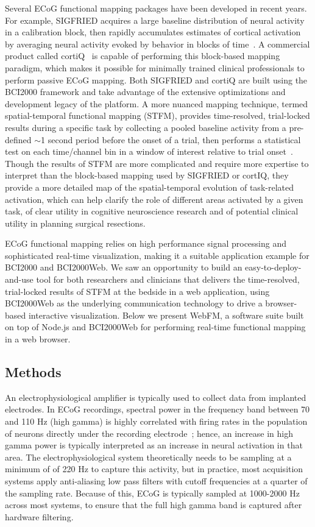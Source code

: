 \documentclass[utf8]{frontiersSCNS}
\begin{document}
Several ECoG functional mapping packages have been developed in recent years.
For example, SIGFRIED acquires a large baseline distribution of neural activity in a calibration block, then rapidly accumulates estimates of cortical activation by averaging neural activity evoked by behavior in blocks of time~\citep{brunner_practical_2009}.
A commercial product called cortiQ~\citep{prueckl_cortiq_2013} is capable of performing this block-based mapping paradigm, which makes it possible for minimally trained clinical professionals to perform passive ECoG mapping.
Both SIGFRIED and cortiQ are built using the BCI2000 framework and take advantage of the extensive optimizations and development legacy of the platform.
A more nuanced mapping technique, termed spatial-temporal functional mapping (STFM), provides time-resolved, trial-locked results during a specific task by collecting a pooled baseline activity from a pre-defined $\sim$1 second period before the onset of a trial, then performs a statistical test on each time/channel bin in a window of interest relative to trial onset~\citep{wang_spatial-temporal_2016}.
Though the results of STFM are more complicated and require more expertise to interpret than the block-based mapping used by SIGFRIED or cortIQ, they provide a more detailed map of the spatial-temporal evolution of task-related activation, which can help clarify the role of different areas activated by a given task, of clear utility in cognitive neuroscience research and of potential clinical utility in planning surgical resections.

ECoG functional mapping relies on high performance signal processing and sophisticated real-time visualization, making it a suitable application example for BCI2000 and BCI2000Web.
We saw an opportunity to build an easy-to-deploy-and-use tool for both researchers and clinicians that delivers the time-resolved, trial-locked results of STFM at the bedside in a web application, using BCI2000Web as the underlying communication technology to drive a browser-based interactive visualization. Below we present WebFM, a software suite built on top of Node.js and BCI2000Web for performing real-time functional mapping in a web browser.


\subsection{Methods}

An electrophysiological amplifier is typically used to collect data from implanted electrodes.
In ECoG recordings, spectral power in the frequency band between 70 and 110 Hz (high gamma) is highly correlated with firing rates in the population of neurons directly under the recording electrode~\citep{ray_effect_2008}; hence, an increase in high gamma power is typically interpreted as an increase in neural activation in that area.
The electrophysiological system theoretically needs to be sampling at a minimum of of 220 Hz to capture this activity, but in practice, most acquisition systems apply anti-aliasing low pass filters with cutoff frequencies at a quarter of the sampling rate.
Because of this, ECoG is typically sampled at 1000-2000 Hz across most systems, to ensure that the full high gamma band is captured after hardware filtering.
\end{document}
